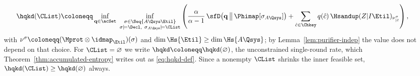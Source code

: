\begin{definition}
\begin{equation}\label{eq:hqkd-list}
  \hqkd(\CList)\coloneqq\inf_{\mathbf q\in\acSet}\
  \inf_{\substack{\sigma\in\Seq{A\Qsys\Etil}\\
  \sigma\models\Decl,\ \sigma_{A\Qsys}\models\CList}}
  \left(\frac{\alpha}{\alpha-1}\,
  \sfD\!\left(\mathbf q\,\middle\|\,\Phimap[\sigma_{A\Qsys}]\right)
  +\sum_{\hat c\in\Chkey}
  q(\hat c)\,\Hsandup(Z|I\Etil)_{\nu^{\sigma}_{|\hat c}}\right),
\end{equation}
with $\nu^{\sigma}\coloneqq(\Mprot\otimes\idmap_{\Etil})(\sigma)$ and
$\dim\Hs{\Etil}\ge\dim\Hs{A\Qsys}$; by
Lemma~\ref{lem:purifier-indep} the value does not depend on that
choice. For $\CList=\varnothing$ we write
$\hqkd\coloneqq\hqkd(\varnothing)$, the unconstrained single-round rate,
which Theorem~\ref{thm:accumulated-entropy} writes out as
\eqref{eq:hqkd-def}. Since a nonempty
$\CList$ shrinks the inner feasible set,
$\hqkd(\CList)\ge\hqkd(\varnothing)$ always.
\end{definition}
